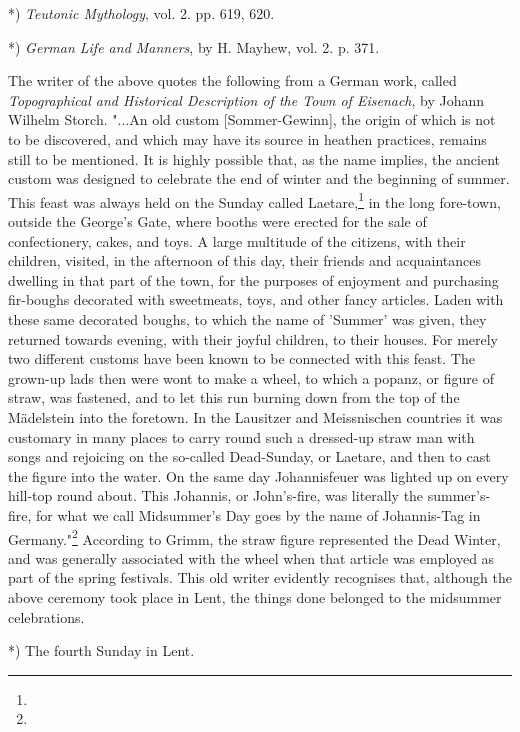 \documentclass[a4paper, 11pt, oneside, polutonikogreek, english]{article}
\begin{document}
*) \emph{Teutonic Mythology}, vol. 2. pp. 619, 620.

*) \emph{German Life and Manners}, by H. Mayhew, vol. 2. p. 371.
 
The writer of the above quotes the following from a German work, called \emph{Topographical and Historical Description of the Town of Eisenach}, by Johann Wilhelm Storch. "...An old custom [Sommer-Gewinn], the origin of which is not to be discovered, and which may have its source in heathen practices, remains still to be mentioned. It is highly possible that, as the name implies, the ancient custom was designed to celebrate the end of winter and the beginning of summer. This feast was always held on the Sunday called Laetare,\footnote{} in the long fore-town, outside the George's Gate, where booths were erected for the sale of confectionery, cakes, and toys. A large multitude of the citizens, with their children, visited, in the afternoon of this day, their friends and acquaintances dwelling in that part of the town, for the purposes of enjoyment and purchasing fir-boughs decorated with sweetmeats, toys, and other fancy articles. Laden with these same decorated boughs, to which the name of 'Summer' was given, they returned towards evening, with their joyful children, to their houses. For merely two different customs have been known to be connected with this feast. The grown-up lads then were wont to make a wheel, to which a popanz, or figure of straw, was fastened, and to let this run burning down from the top of the Mädelstein into the foretown. In the Lausitzer and Meissnischen countries it was customary in many places to carry round such a dressed-up straw man with songs and rejoicing on the so-called Dead-Sunday, or Laetare, and then to cast the figure into the water. On the same day Johannisfeuer was lighted up on every hill-top round about. This Johannis, or John's-fire, was literally the summer's-fire, for what we call Midsummer's Day goes by the name of Johannis-Tag in Germany."\footnote{} According to Grimm, the straw figure represented the Dead Winter, and was generally associated with the wheel when that article was employed as part of the spring festivals. This old writer evidently recognises that, although the above ceremony took place in Lent, the things done belonged to the midsummer celebrations.

*) The fourth Sunday in Lent.
\end{document}

